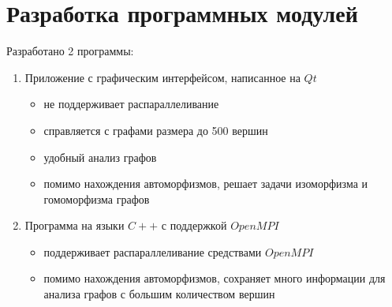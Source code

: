 \section{Разработка программных модулей}
\label{sec:Development_7} 
\large

Разработано 2 программы:

\begin{enumerate}
\item Приложение с графическим интерфейсом, написанное на $Qt$
\begin{itemize}
\item не поддерживает распараллеливание
\item справляется с графами размера до 500 вершин
\item удобный анализ графов
\item помимо нахождения автоморфизмов, решает задачи изоморфизма и гомоморфизма графов
\end{itemize} 
\item Программа на языки $C++$ с поддержкой $OpenMPI$
\begin{itemize}
\item поддерживает распараллеливание средствами $OpenMPI$
\item помимо нахождения автоморфизмов, сохраняет много информации для анализа графов с большим количеством вершин
\end{itemize} 
\end{enumerate} 

